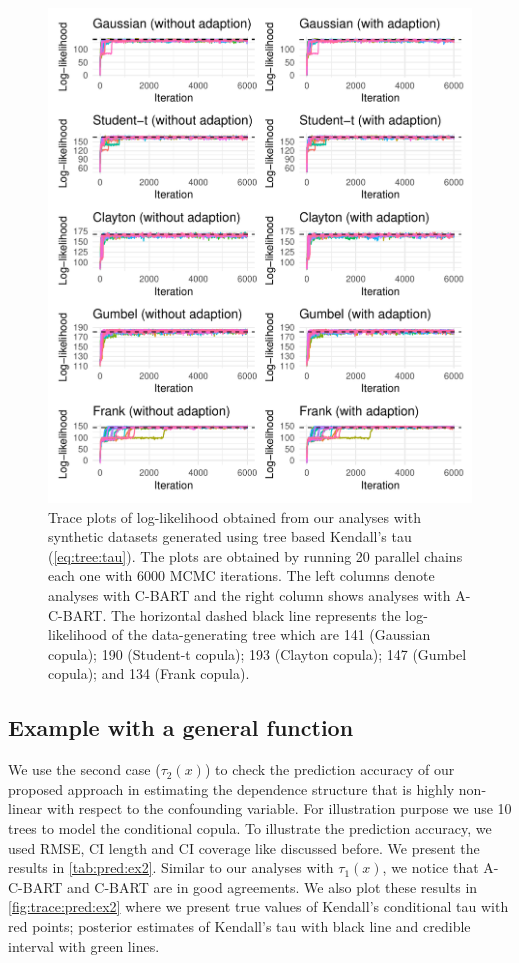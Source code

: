 \documentclass{amsart}
\begin{document}
\begin{figure}
	\centering
	\includegraphics[width = 0.95\linewidth]{"case_1_likelihood.pdf"}
	\caption{Trace plots of log-likelihood obtained from our analyses with synthetic datasets generated using tree based Kendall's tau (\cref{eq:tree:tau}). The plots are obtained by running 20 parallel chains each one with 6000 MCMC iterations. The left columns denote analyses with C-BART and the right column shows analyses with A-C-BART. The horizontal dashed black line represents the log-likelihood of the data-generating tree which are 141 (Gaussian copula); 190 (Student-t copula); 193 (Clayton copula); 147 (Gumbel copula); and 134 (Frank copula).}
	\label{fig:trace:like:ex1}
\end{figure}

\subsection{Example with a general function}
We use the second case ($\tau_2(x)$) to check the prediction accuracy of our proposed approach in estimating the dependence structure that is highly non-linear with respect to the confounding variable. For illustration purpose we use 10 trees to model the conditional copula. To illustrate the prediction accuracy, we used RMSE, CI length and CI coverage like discussed before. We present the results in \cref{tab:pred:ex2}. Similar to our analyses with $\tau_1(x)$, we notice that A-C-BART and C-BART are in good agreements.  We also plot these results in \cref{fig:trace:pred:ex2} where we present true values of Kendall's conditional tau with red points; posterior estimates of Kendall's tau with black line and credible interval with green lines. 
\end{document}
